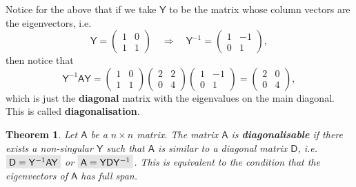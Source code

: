 \documentclass[letter-paper]{tufte-book}
\newtheorem{theorem}{\color{pastel-blue}Theorem}[section]
\newcommand{\highlight}[1]{\mathchoice%
  {\colorbox{black!10}{$\displaystyle#1$}}%
  {\colorbox{black!10}{$\textstyle#1$}}%
  {\colorbox{black!10}{$\scriptstyle#1$}}%
  {\colorbox{black!10}{$\scriptscriptstyle#1$}}}%
\begin{document}
Notice for the above that if we take $\mathsf{Y}$ to be the matrix whose column
vectors are the eigenvectors, i.e.
\begin{equation*}
  \mathsf{Y} = \begin{pmatrix}1 & 0 \\ 1 & 1\end{pmatrix} \quad \Rightarrow \quad \mathsf{Y}^{-1} = \begin{pmatrix}1 & -1 \\ 0 & 1\end{pmatrix},
\end{equation*}
then notice that 
\begin{equation*}
  \mathsf{Y}^{-1}\mathsf{AY} = \begin{pmatrix}1 & 0 \\ 1 & 1\end{pmatrix}\begin{pmatrix}2 & 2 \\ 0 & 4\end{pmatrix}\begin{pmatrix}1 & -1 \\ 0 & 1\end{pmatrix} = \begin{pmatrix}2 & 0 \\ 0 & 4\end{pmatrix},
\end{equation*}
which is just the \textbf{diagonal} matrix with the eigenvalues on the main
diagonal. This is called \textbf{diagonalisation}.

\begin{theorem}
  Let $\mathsf{A}$ be a $n\times n$ matrix. The matrix $\mathsf{A}$ is
  \textbf{diagonalisable} if there exists a non-singular $\mathsf{Y}$ such that
  $\mathsf{A}$ is similar to a diagonal matrix $\mathsf{D}$, i.e.
  $\highlight{\mathsf{D} = \mathsf{Y}^{-1}\mathsf{AY}}$ or
  $\highlight{\mathsf{A} = \mathsf{YD}\mathsf{Y}^{-1}}$. This is equivalent to
  the condition that the eigenvectors of $\mathsf{A}$ has full span.
\end{theorem}
\end{document}
